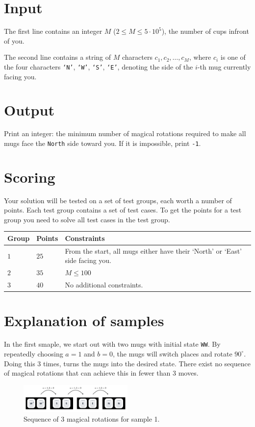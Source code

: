 \section*{Input}
The first line contains an integer $M$ ($2 \leq M \leq 5 \cdot 10^5$), the number of cups infront of you.

The second line contains a string of $M$ characters $c_1, c_2, \dots, c_M$, where $c_i$ is one of the four characters \texttt{`N'}, \texttt{`W'}, \texttt{`S'}, \texttt{`E'}, denoting the side of the $i$-th mug currently facing you.

\section*{Output}
Print an integer: the minimum number of magical rotations required to make all mugs face the \texttt{North} side toward you. If it is impossible, print \texttt{-1}.

\section*{Scoring}
Your solution will be tested on a set of test groups, each worth a number of points. Each test group contains
a set of test cases. To get the points for a test group you need to solve all test cases in the test group.

\noindent
\begin{tabular}{| l | l | p{12cm} |}
  \hline
  \textbf{Group} & \textbf{Points} & \textbf{Constraints} \\ \hline
  $1$    & $25$       & From the start, all mugs either have their `North' or `East' side facing you. \\ \hline
  $2$    & $35$       & $M \leq 100$ \\ \hline
  $3$    & $40$       & No additional constraints. \\ \hline
\end{tabular}


\section*{Explanation of samples}
\noindent
In the first smaple, we start out with two mugs with initial state \texttt{WW}. 
By repeatedly choosing $a = 1$ and $b = 0$, the mugs will switch places and rotate $90^\circ$. Doing this 3 times, turns the mugs into the desired state. 
There exist no sequence of magical rotations that can achieve this in fewer than 3 moves.
\begin{figure}[h!]
  \centering
  \includegraphics[width=0.5\textwidth]{sample1.png}
  \caption{Sequence of 3 magical rotations for sample 1.}
\end{figure}


